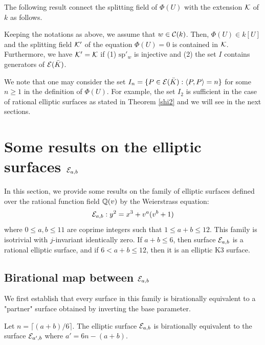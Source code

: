 \documentclass[11pt]{amsart}
\begin{document}
The following result connect the splitting field of $\Phi(U)$ with the extension ${\mathcal K}$ of $k$ as follows.
\begin{thm}
	\label{phi}
	Keeping the notations as above, we assume that $w\in {\mathcal C}(k)$. Then,   $\Phi(U)\in k[U]$ and 
	the splitting field ${\mathcal K}'$ of the equation $\Phi(U)=0$ is contained in ${\mathcal K}$. Furthermore, we have ${\mathcal K}'={\mathcal K}$ if 
	(1)  $\text{sp}'_w$ is injective and (2) the set $I$ contains generators of ${\mathcal E}({{\bar K}})$.
\end{thm}
We note that  one may consider the set 
$I_n=\{P\in {\mathcal E}({{\bar K}}):  \left\langle P,  P\right\rangle =n\}$ for some $n\geq 1$ in the definition of $\Phi(U)$.
For example,  the set $I_2$ is sufficient in the case of rational elliptic surfaces as stated in Theorem \eqref{shi2} and we will see in the next sections.
\fi


\section{Some results on the elliptic surfaces ${\mathcal E}_{a,b}$}
\label{Eab}
In this section, we provide some results on the family of elliptic surfaces defined over the rational function field ${\mathbb Q}(v)$ by the Weierstrass equation:
\begin{equation} \label{eq:main}
	{\mathcal E}_{a,b}: y^2 = x^3 + v^a(v^b+1)
\end{equation}
where $0 \leq a, b\leq 11$ are  coprime integers such that  $1   \leq a+b \leq 12$. This family is isotrivial with $j$-invariant identically zero.
If $a+b \leq 6$, then  surface  ${\mathcal E}_{a,b}$ is a rational elliptic surface, and if
 $6 < a+b \leq 12$, then it is an elliptic K3 surface.


 
\subsection{Birational map between ${\mathcal E}_{a,b}$}

We first establish that every surface in this family is birationally equivalent to a "partner" surface obtained by inverting the base parameter.

\begin{thm} 
	\label{thm:birational}
	Let $n = \lceil (a+b)/6 \rceil$. The elliptic surface ${\mathcal E}_{a,b}$ is birationally equivalent to the surface ${\mathcal E}_{a', b}$ where $a' = 6n - (a+b)$.
\end{thm}
\end{document}

